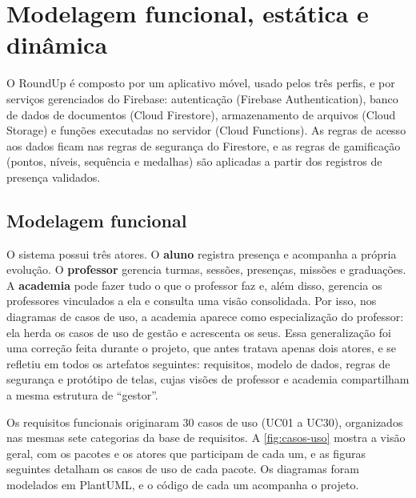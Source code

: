 
\chapter{Modelagem funcional, estática e dinâmica}
\label{cap:modelagem}

O RoundUp é composto por um aplicativo móvel, usado pelos três perfis, e
por serviços gerenciados do Firebase: autenticação (Firebase
Authentication), banco de dados de documentos (Cloud Firestore),
armazenamento de arquivos (Cloud Storage) e funções executadas no servidor
(Cloud Functions). As regras de acesso aos dados ficam nas regras de
segurança do Firestore, e as regras de gamificação (pontos, níveis,
sequência e medalhas) são aplicadas a partir dos registros de presença
validados.

\section{Modelagem funcional}
\label{sec:modelagem-funcional}

O sistema possui três atores. O \textbf{aluno} registra presença e
acompanha a própria evolução. O \textbf{professor} gerencia turmas,
sessões, presenças, missões e graduações. A \textbf{academia} pode fazer
tudo o que o professor faz e, além disso, gerencia os professores
vinculados a ela e consulta uma visão consolidada. Por isso, nos
diagramas de casos de uso, a academia aparece como especialização do
professor: ela herda os casos de uso de gestão e acrescenta os seus. Essa
generalização foi uma correção feita durante o projeto, que antes tratava
apenas dois atores, e se refletiu em todos os artefatos seguintes:
requisitos, modelo de dados, regras de segurança e protótipo de telas,
cujas visões de professor e academia compartilham a mesma estrutura de
``gestor''.

Os requisitos funcionais originaram 30 casos de uso (UC01 a UC30),
organizados nas mesmas sete categorias da base de requisitos. A
\autoref{fig:casos-uso} mostra a visão geral, com os pacotes e os atores
que participam de cada um, e as figuras seguintes detalham os casos de
uso de cada pacote. Os diagramas foram modelados em PlantUML, e o código
de cada um acompanha o projeto.

